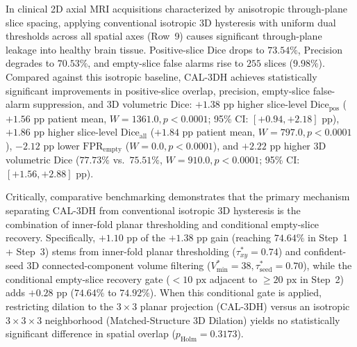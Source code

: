\documentclass[11pt,a4paper]{article}
\begin{document}
In clinical 2D axial MRI acquisitions characterized by anisotropic through-plane slice spacing, applying conventional isotropic 3D hysteresis with uniform dual thresholds across all spatial axes (Row~9) causes significant through-plane leakage into healthy brain tissue. Positive-slice Dice drops to $73.54\%$, Precision degrades to $70.53\%$, and empty-slice false alarms rise to $255$ slices ($9.98\%$). Compared against this isotropic baseline, CAL-3DH achieves statistically significant improvements in positive-slice overlap, precision, empty-slice false-alarm suppression, and 3D volumetric Dice: $+1.38\text{ pp}$ higher slice-level $\text{Dice}_{\text{pos}}$ ($+1.56\text{ pp}$ patient mean, $W = 1361.0, p < 0.0001$; 95\% CI: $[+0.94, +2.18]\text{ pp}$), $+1.86\text{ pp}$ higher slice-level $\text{Dice}_{\text{all}}$ ($+1.84\text{ pp}$ patient mean, $W = 797.0, p < 0.0001$), $-2.12\text{ pp}$ lower $\text{FPR}_{\text{empty}}$ ($W = 0.0, p < 0.0001$), and $+2.22\text{ pp}$ higher 3D volumetric Dice ($77.73\%$ vs.\ $75.51\%$, $W = 910.0, p < 0.0001$; 95\% CI: $[+1.56, +2.88]\text{ pp}$).

Critically, comparative benchmarking demonstrates that the primary mechanism separating CAL-3DH from conventional isotropic 3D hysteresis is the combination of inner-fold planar thresholding and conditional empty-slice recovery. Specifically, $+1.10\text{ pp}$ of the $+1.38\text{ pp}$ gain (reaching $74.64\%$ in Step~1 + Step~3) stems from inner-fold planar thresholding ($\tau_{xy}^* = 0.74$) and confident-seed 3D connected-component volume filtering ($V_{\min}^* = 38, \tau_{\text{seed}}^* = 0.70$), while the conditional empty-slice recovery gate ($<10\text{ px}$ adjacent to $\ge 20\text{ px}$ in Step~2) adds $+0.28\text{ pp}$ ($74.64\%$ to $74.92\%$). When this conditional gate is applied, restricting dilation to the $3 \times 3$ planar projection (CAL-3DH) versus an isotropic $3 \times 3 \times 3$ neighborhood (Matched-Structure 3D Dilation) yields no statistically significant difference in spatial overlap ($p_{\text{Holm}} = 0.3173$).
\end{document}
